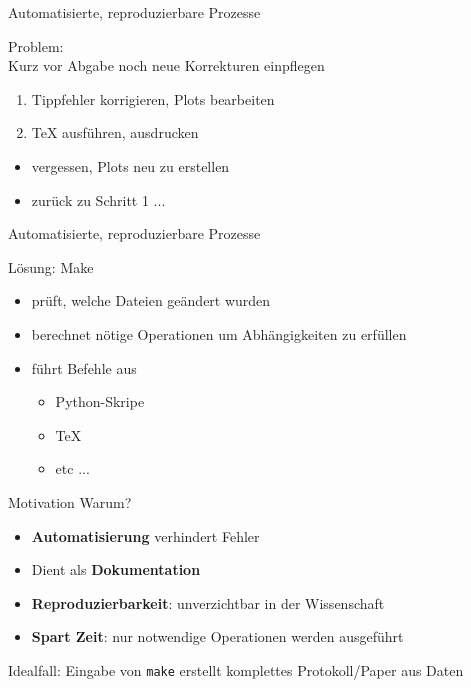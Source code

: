 \begin{frame}{Automatisierte, reproduzierbare Prozesse}

  {\huge Problem:}\\
  \vspace{1em}
  Kurz vor Abgabe noch neue Korrekturen einpflegen
  \begin{enumerate}
    \item Tippfehler korrigieren, Plots bearbeiten
    \item \TeX{} ausführen, ausdrucken
  \end{enumerate}
  \begin{itemize}
    \item vergessen, Plots neu zu erstellen
    \item zurück zu Schritt 1 ...  
  \end{itemize}
\end{frame}

\begin{frame}{Automatisierte, reproduzierbare Prozesse}

  {\huge Lösung: Make}
  \vspace{1em}
  \begin{itemize}
    \item prüft, welche Dateien geändert wurden
    \item berechnet nötige Operationen um Abhängigkeiten zu erfüllen
    \item führt Befehle aus
    \begin{itemize}
      \item Python-Skripe
      \item \TeX{}
      \item etc ...
    \end{itemize}
  \end{itemize}
\end{frame}

\begin{frame}{Motivation}
  {\huge Warum?}
  \vspace{1em}
  \begin{itemize}
    \item \textbf{Automatisierung} verhindert Fehler
    \item Dient als \textbf{Dokumentation}
    \item \textbf{Reproduzierbarkeit}: unverzichtbar in der Wissenschaft
    \item \textbf{Spart Zeit}: nur notwendige Operationen werden ausgeführt
  \end{itemize}
  \vspace{1em}
  Idealfall: Eingabe von \texttt{make} erstellt komplettes Protokoll/Paper aus Daten
\end{frame}

